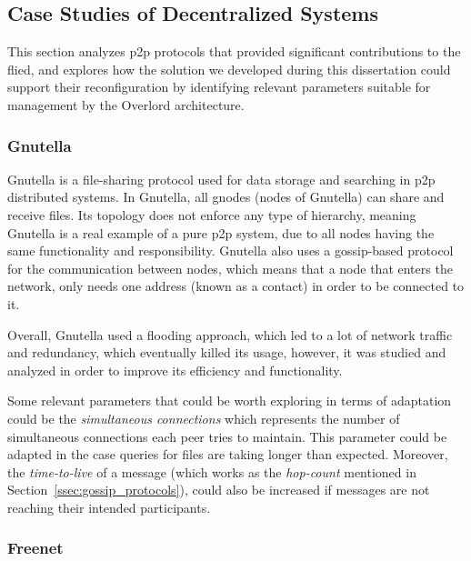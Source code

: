 \subsection{Case Studies of Decentralized Systems}
\label{ssec:case_studies_of_decentralized_systems}

This section analyzes \gls{p2p} protocols that provided significant contributions to the flied, and explores how the solution we developed during this dissertation could support their reconfiguration by identifying relevant parameters suitable for management by the Overlord architecture.

\subsubsection{Gnutella}
\label{sssec:gnutella}

Gnutella \cite{Bordignon2001} is a file-sharing protocol used for data storage and searching in \gls{p2p} distributed systems. In Gnutella, all gnodes (nodes of Gnutella) can share and receive files. Its topology does not enforce any type of hierarchy, meaning Gnutella is a real example of a pure \gls{p2p} system, due to all nodes having the same functionality and responsibility. Gnutella also uses a gossip-based protocol for the communication between nodes, which means that a node that enters the network, only needs one address (known as a contact) in order to be connected to it.

Overall, Gnutella used a flooding approach, which led to a lot of network traffic and redundancy, which eventually killed its usage, however, it was studied and analyzed in order to improve its efficiency and functionality.

Some relevant parameters that could be worth exploring in terms of adaptation could be the \textit{simultaneous connections} which represents the number of simultaneous connections each peer tries to maintain. This parameter could be adapted in the case queries for files are taking longer than expected. Moreover, the \textit{time-to-live} of a message (which works as the \textit{hop-count} mentioned in Section~\ref{ssec:gossip_protocols}), could also be increased if messages are not reaching their intended participants.

\subsubsection{Freenet}
\label{sssec:freenet}

